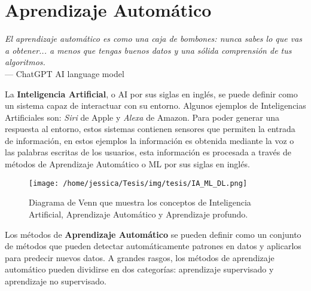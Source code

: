 \chapter{Aprendizaje Automático}\label{ch:ML}
\begin{flushright}{\slshape
    El aprendizaje automático es como una caja de bombones: nunca sabes lo que vas a obtener... a menos que tengas buenos datos y una sólida comprensión de tus algoritmos.} \\ \medskip
    --- ChatGPT AI language model
\end{flushright}



La \textbf{Inteligencia Artificial}, o AI por sus siglas en inglés, se puede definir como un sistema capaz de interactuar con su entorno. Algunos ejemplos de Inteligencias Artificiales son: \emph{Siri} de Apple y \emph{Alexa} de Amazon. Para poder generar una respuesta al entorno, estos sistemas contienen sensores que permiten la entrada de información, en estos ejemplos la información es obtenida mediante la voz o las palabras escritas de los usuarios, esta información es procesada a través de métodos de Aprendizaje Automático o ML por sus siglas en inglés.

\begin{figure}[!htbp]
  \centering
  \texttt{[image: /home/jessica/Tesis/img/tesis/IA\_ML\_DL.png]}
  \caption{Diagrama de Venn que muestra los conceptos de Inteligencia Artificial, Aprendizaje Automático y Aprendizaje profundo.}
  \label{fig:IA-ML-DL}
\end{figure}

Los métodos de \textbf{Aprendizaje Automático} se pueden definir como un conjunto de métodos que pueden detectar automáticamente patrones en datos y aplicarlos para predecir nuevos datos. A grandes rasgos, los métodos de aprendizaje automático pueden dividirse en dos categorías: aprendizaje supervisado y aprendizaje no supervisado. \cite{murphy:2013}

